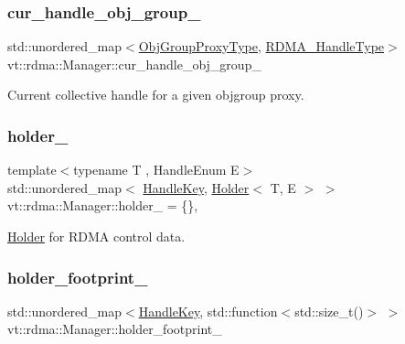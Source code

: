 \subsubsection{\texorpdfstring{cur\+\_\+handle\+\_\+obj\+\_\+group\+\_\+}{cur\_handle\_obj\_group\_}}
{\footnotesize\ttfamily std\+::unordered\+\_\+map$<$\hyperlink{namespacevt_ad7cae989df485fccca57f0792a880a8e}{Obj\+Group\+Proxy\+Type}, \hyperlink{namespacevt_a10442579ec4e7ebef223818e64bcf908}{R\+D\+M\+A\+\_\+\+Handle\+Type}$>$ vt\+::rdma\+::\+Manager\+::cur\+\_\+handle\+\_\+obj\+\_\+group\+\_\+\hspace{0.3cm}{\ttfamily [private]}}



Current collective handle for a given objgroup proxy. 

\mbox{\label{structvt_1_1rdma_1_1_manager_ab5b5ed6b205fba6f378ef22cdb3d4143}} 
\subsubsection{\texorpdfstring{holder\+\_\+}{holder\_}}
{\footnotesize\ttfamily template$<$typename T , Handle\+Enum E$>$ \\
std\+::unordered\+\_\+map$<$ \hyperlink{structvt_1_1rdma_1_1_handle_key}{Handle\+Key}, \hyperlink{structvt_1_1rdma_1_1_holder}{Holder}$<$ T, E $>$ $>$ vt\+::rdma\+::\+Manager\+::holder\+\_\+ = \{\}\hspace{0.3cm}{\ttfamily [static]}, {\ttfamily [private]}}



\hyperlink{structvt_1_1rdma_1_1_holder}{Holder} for R\+D\+MA control data. 

\mbox{\label{structvt_1_1rdma_1_1_manager_a7f037c941c0c8fc3d5b29b3d235bf280}} 
\subsubsection{\texorpdfstring{holder\+\_\+footprint\+\_\+}{holder\_footprint\_}}
{\footnotesize\ttfamily std\+::unordered\+\_\+map$<$\hyperlink{structvt_1_1rdma_1_1_handle_key}{Handle\+Key}, std\+::function$<$std\+::size\+\_\+t()$>$ $>$ vt\+::rdma\+::\+Manager\+::holder\+\_\+footprint\+\_\+\hspace{0.3cm}{\ttfamily [private]}}

